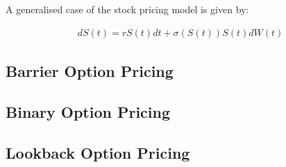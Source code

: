 A generalised case of the stock pricing model is given by:

\begin{align}
    dS(t) = rS(t)dt + \sigma(S(t))S(t)dW(t)
\end{align}

\subsection{Barrier Option Pricing}

\subsection{Binary Option Pricing}

\subsection{Lookback Option Pricing}



\newpage


